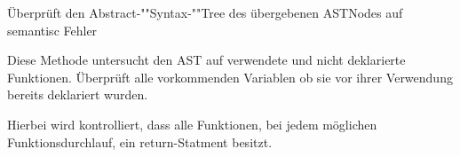 \begin{description}
		Überprüft den Abstract-""Syntax-""Tree des übergebenen ASTNodes auf semantisc Fehler	

		Diese Methode untersucht den AST auf verwendete und nicht deklarierte Funktionen.	
		Überprüft alle vorkommenden Variablen ob sie vor ihrer Verwendung bereits deklariert wurden.

		Hierbei wird kontrolliert, dass alle Funktionen, bei jedem möglichen Funktionsdurchlauf, ein return-Statment besitzt.

\end{description}

